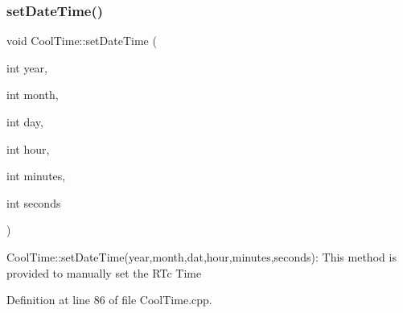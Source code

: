 \subsubsection{\texorpdfstring{set\+Date\+Time()}{setDateTime()}}
{\footnotesize\ttfamily void Cool\+Time\+::set\+Date\+Time (\begin{DoxyParamCaption}\item[{int}]{year,  }\item[{int}]{month,  }\item[{int}]{day,  }\item[{int}]{hour,  }\item[{int}]{minutes,  }\item[{int}]{seconds }\end{DoxyParamCaption})}

Cool\+Time\+::set\+Date\+Time(year,month,dat,hour,minutes,seconds)\+: This method is provided to manually set the R\+Tc Time 

Definition at line 86 of file Cool\+Time.\+cpp.


